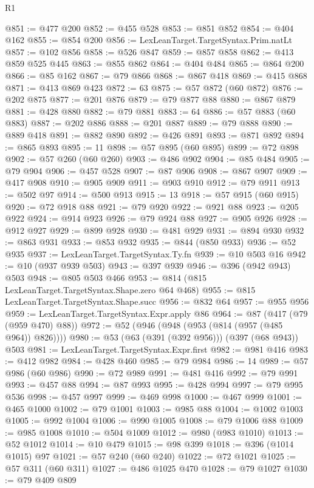 \begin{lexlean}{R1}
\begin{coremodule}
@851 := @477 @200
@852 := @455 @528
@853 := @851 @852
@854 := @404 @162
@855 := @854 @200
@856 := LexLeanTarget.TargetSyntax.Prim.natLt
@857 := @102 @856
@858 := @526 @847
@859 := @857 @858
@862 := @413 @859 @525 @445
@863 := @855 @862
@864 := @404 @484
@865 := @864 @200
@866 := @85 @162
@867 := @79 @866
@868 := @867 @418
@869 := @415 @868
@871 := @413 @869 @423
@872 := 63
@875 := @57 @872 (@60 @872)
@876 := @202 @875
@877 := @201 @876
@879 := @79 @877 @88
@880 := @867 @879
@881 := @428 @880
@882 := @79 @881
@883 := 64
@886 := @57 @883 (@60 @883)
@887 := @202 @886
@888 := @201 @887
@889 := @79 @888
@890 := @889 @418
@891 := @882 @890
@892 := @426 @891
@893 := @871 @892
@894 := @865 @893
@895 := 11
@898 := @57 @895 (@60 @895)
@899 := @72 @898
@902 := @57 @260 (@60 @260)
@903 := @486 @902
@904 := @85 @484
@905 := @79 @904
@906 := @457 @528
@907 := @87 @906
@908 := @867 @907
@909 := @417 @908
@910 := @905 @909
@911 := @903 @910
@912 := @79 @911
@913 := @502 @97
@914 := @500 @913
@915 := 13
@918 := @57 @915 (@60 @915)
@920 := @72 @918 @88
@921 := @79 @920
@922 := @921 @88
@923 := @205 @922
@924 := @914 @923
@926 := @79 @924 @88
@927 := @905 @926
@928 := @912 @927
@929 := @899 @928
@930 := @481 @929
@931 := @894 @930
@932 := @863 @931
@933 := @853 @932
@935 := @844 (@850 @933)
@936 := @52 @935
@937 := LexLeanTarget.TargetSyntax.Ty.fn
@939 := @10 @503 @16
@942 := @10 (@937 @939 @503)
@943 := @397 @939
@946 := @396 (@942 @943) @503
@948 := @805 @503 @466
@953 := @814 (@815 LexLeanTarget.TargetSyntax.Shape.zero @64 @468)
@955 := @815 LexLeanTarget.TargetSyntax.Shape.succ
@956 := @832 @64
@957 := @955 @956
@959 := LexLeanTarget.TargetSyntax.Expr.apply @86
@964 := @87 (@417 (@79 (@959 @470) @88))
@972 := @52 (@946 (@948 (@953 (@814 (@957 (@485 @964)) @826))))
@980 := @53 (@63 (@391 (@392 @956))) (@397 (@68 @943)) @503
@981 := LexLeanTarget.TargetSyntax.Expr.first
@982 := @981 @416
@983 := @412 @982
@984 := @428 @460
@985 := @79 @984
@986 := 14
@989 := @57 @986 (@60 @986)
@990 := @72 @989
@991 := @481 @416
@992 := @79 @991
@993 := @457 @88
@994 := @87 @993
@995 := @428 @994
@997 := @79 @995 @536
@998 := @457 @997
@999 := @469 @998
@1000 := @467 @999
@1001 := @465 @1000
@1002 := @79 @1001
@1003 := @985 @88
@1004 := @1002 @1003
@1005 := @992 @1004
@1006 := @990 @1005
@1008 := @79 @1006 @88
@1009 := @985 @1008
@1010 := @504 @1009
@1012 := @980 (@983 @1010)
@1013 := @52 @1012
@1014 := @10 @479
@1015 := @98 @399
@1018 := @396 (@1014 @1015) @97
@1021 := @57 @240 (@60 @240)
@1022 := @72 @1021
@1025 := @57 @311 (@60 @311)
@1027 := @486 @1025 @470
@1028 := @79 @1027
@1030 := @79 @409 @809

\end{coremodule}
\end{lexlean}
